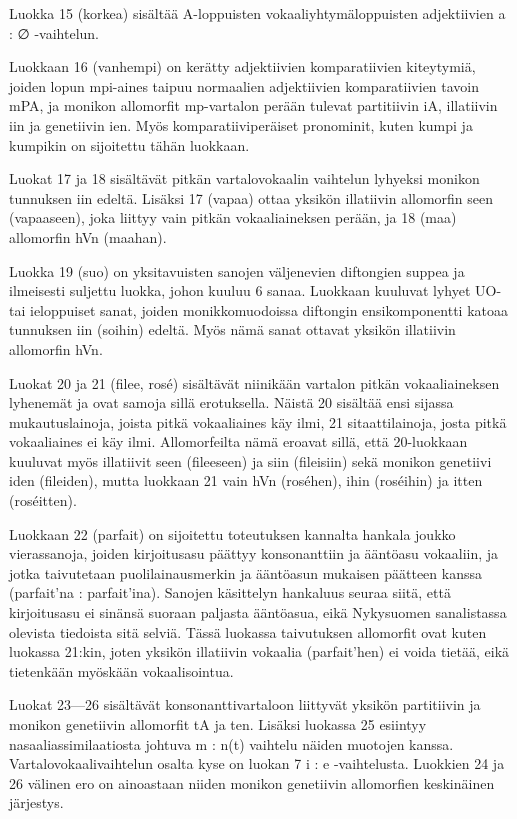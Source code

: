 \documentclass[free]{flammie}
\begin{document}
Luokka 15 (korkea) sisältää A-loppuisten vokaaliyhtymäloppuisten adjektiivien
a : ∅ -vaihtelun.

Luokkaan 16 (vanhempi) on kerätty adjektiivien komparatiivien kiteytymiä, joiden lopun mpi-aines taipuu normaalien adjektiivien komparatiivien tavoin mPA,
ja monikon allomorfit mp-vartalon perään tulevat partitiivin iA, illatiivin iin ja genetiivin ien. Myös komparatiiviperäiset pronominit, kuten kumpi ja kumpikin on
sijoitettu tähän luokkaan.

Luokat 17 ja 18 sisältävät pitkän vartalovokaalin vaihtelun lyhyeksi monikon tunnuksen iin edeltä. Lisäksi 17 (vapaa) ottaa yksikön illatiivin allomorfin seen (vapaaseen), joka liittyy vain pitkän vokaaliaineksen perään, ja 18 (maa) allomorfin
hVn (maahan).

Luokka 19 (suo) on yksitavuisten sanojen väljenevien diftongien suppea ja ilmeisesti suljettu luokka, johon kuuluu 6 sanaa. Luokkaan kuuluvat lyhyet UO- tai ieloppuiset sanat, joiden monikkomuodoissa diftongin ensikomponentti katoaa tunnuksen iin (soihin) edeltä. Myös nämä sanat ottavat yksikön illatiivin allomorfin
hVn.

Luokat 20 ja 21 (filee, rosé) sisältävät niinikään vartalon pitkän vokaaliaineksen
lyhenemät ja ovat samoja sillä erotuksella. Näistä 20 sisältää ensi sijassa mukautuslainoja, joista pitkä vokaaliaines käy ilmi, 21 sitaattilainoja, josta pitkä vokaaliaines ei käy ilmi. Allomorfeilta nämä eroavat sillä, että 20-luokkaan kuuluvat
myös illatiivit seen (fileeseen) ja siin (fileisiin) sekä monikon genetiivi iden (fileiden), mutta luokkaan 21 vain hVn (roséhen), ihin (roséihin) ja itten (roséitten).

Luokkaan 22 (parfait) on sijoitettu toteutuksen kannalta hankala joukko vierassanoja, joiden kirjoitusasu päättyy konsonanttiin ja ääntöasu vokaaliin, ja jotka taivutetaan puolilainausmerkin ja ääntöasun mukaisen päätteen kanssa (parfait’na :
parfait’ina). Sanojen käsittelyn hankaluus seuraa siitä, että kirjoitusasu ei sinänsä
suoraan paljasta ääntöasua, eikä Nykysuomen sanalistassa olevista tiedoista sitä selviä. Tässä luokassa taivutuksen allomorfit ovat kuten luokassa 21:kin, joten
yksikön illatiivin vokaalia (parfait’hen) ei voida tietää, eikä tietenkään myöskään
vokaalisointua.

Luokat 23—26 sisältävät konsonanttivartaloon liittyvät yksikön partitiivin ja monikon genetiivin allomorfit tA ja ten. Lisäksi luokassa 25 esiintyy nasaaliassimilaatiosta johtuva m : n(t) vaihtelu näiden muotojen kanssa. Vartalovokaalivaihtelun osalta kyse on luokan 7 i : e -vaihtelusta. Luokkien 24 ja 26 välinen ero on
ainoastaan niiden monikon genetiivin allomorfien keskinäinen järjestys.
\end{document}
